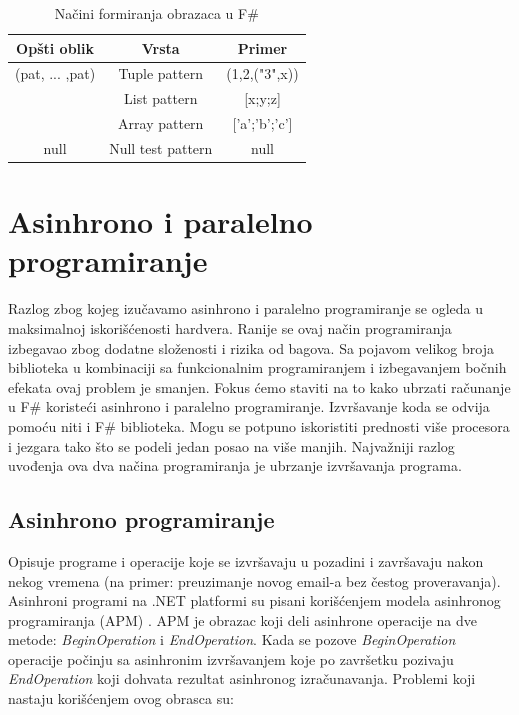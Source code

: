 \documentclass[a4paper]{article}
\begin{document}
\begin{table}[h!]
\begin{center}
\caption{Načini formiranja obrazaca u F\#}
\begin{tabular}{|c|c|c|} \hline
\textbf{Opšti oblik}& \textbf{Vrsta}& \textbf{Primer}\\ \hline
(pat, ... ,pat) &Tuple pattern&(1,2,("3",x))
\\ \hline
[pat, ... ,pat] &List pattern&[x;y;z]\\ \hline
[|pat, ... ,pat|] &Array pattern&['a';'b';'c']\\ \hline
null &Null test pattern&null\\ \hline
\end{tabular}
\label{tab:tabela1}
\end{center}
\end{table}


\section{Asinhrono i paralelno programiranje}

Razlog zbog kojeg izučavamo asinhrono i paralelno programiranje se ogleda u maksimalnoj iskorišćenosti hardvera. Ranije se ovaj način programiranja izbegavao zbog dodatne složenosti i rizika od bagova. Sa pojavom velikog broja biblioteka u kombinaciji sa funkcionalnim programiranjem i izbegavanjem bočnih efekata ovaj problem je smanjen. Fokus ćemo staviti na to kako ubrzati računanje u F\# koristeći asinhrono i paralelno programiranje. Izvršavanje koda se odvija pomoću niti i F\# biblioteka. Mogu se potpuno iskoristiti prednosti više procesora i jezgara tako što se podeli jedan posao na više manjih. Najvažniji razlog uvođenja ova dva načina programiranja je ubrzanje izvršavanja programa.


\subsection{Asinhrono programiranje} 

Opisuje programe i operacije koje se izvršavaju u pozadini i završavaju nakon nekog vremena (na primer: preuzimanje novog email-a bez čestog proveravanja). Asinhroni programi na .NET platformi su pisani korišćenjem modela asinhronog programiranja (APM) \cite{apm}. APM je obrazac koji deli asinhrone operacije na dve metode: {\em BeginOperation} i {\em EndOperation}. Kada se pozove {\em BeginOperation} operacije počinju sa asinhronim izvršavanjem koje po završetku pozivaju {\em EndOperation} koji dohvata rezultat asinhronog izračunavanja. Problemi koji nastaju korišćenjem ovog obrasca su: \\
\end{document}
